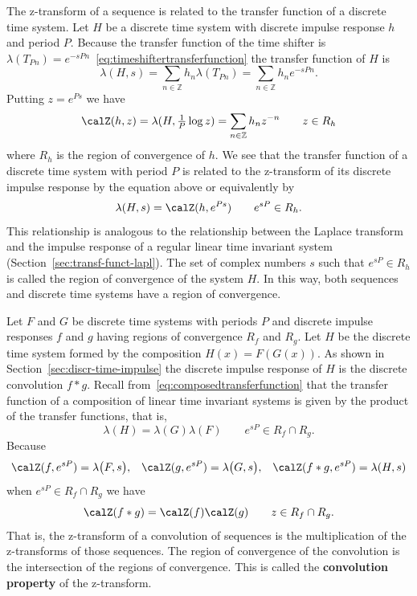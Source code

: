 \documentclass[11pt,a4paper]{book}
\theoremstyle{plain}
\numberwithin{equation}{section}
\newcommand{\ints}{{\mathbb Z}}
\newcommand{\term}{\textbf}
\begin{document}
The z-transform of a sequence is related to the transfer function of a discrete time system.  Let $H$ be a discrete time system with discrete impulse response $h$ and period $P$.  Because the transfer function of the time shifter is $\lambda(T_{Pn}) = e^{-sPn}$~\eqref{eq:timeshiftertransferfunction} the transfer function of $H$ is
\[
\lambda(H,s) = \sum_{n \in \ints} h_n \lambda( T_{Pn} ) = \sum_{n \in \ints} h_n e^{-sP n}.
\]
Putting $z = e^{Ps}$ we have
\[
\calZ(h,z) = \lambda(H, \tfrac{1}{P} \log z) = \sum_{n \in \ints} h_n z^{-n} \qquad z \in R_h
\]
where $R_h$ is the region of convergence of $h$.  We see that the transfer function of a discrete time system with period $P$ is related to the z-transform of its discrete impulse response by the equation above or equivalently by
\begin{equation}\label{eq:reltransferfunztrans}
\lambda(H,s) = \calZ(h,e^{Ps}) \qquad e^{sP} \in R_h.
\end{equation}
This relationship is analogous to the relationship between the Laplace transform and the impulse response of a regular linear time invariant system (Section~\ref{sec:transf-funct-lapl}).  The set of complex numbers $s$ such that $e^{sP} \in R_h$ is called the region of convergence of the system $H$.  In this way, both sequences and discrete time systems have a region of convergence. 

Let $F$ and $G$ be discrete time systems with periods $P$ and discrete impulse responses $f$ and $g$ having regions of convergence $R_f$ and $R_g$.  Let $H$ be the discrete time system formed by the composition $H(x)=F(G(x))$.  As shown in Section~\ref{sec:discr-time-impulse} the discrete impulse response of $H$ is the discrete convolution $f * g$.  Recall from~\eqref{eq:composedtransferfunction} that the transfer function of a composition of linear time invariant systems is given by the product of the transfer functions, that is,
\[
\lambda( H ) = \lambda(G)\lambda(F) \qquad e^{sP} \in R_f \cap R_g.
\]
Because
\[
\calZ(f, e^{sP}) = \lambda\big( F ,s \big) , \;\;\; \calZ(g, e^{sP}) = \lambda\big( G ,s \big), \;\;\; \calZ(f * g, e^{sP}) = \lambda( H ,s )
\]
when $e^{sP} \in R_f \cap R_g$ we have
\[
\calZ( f * g) = \calZ(f) \calZ(g) \qquad z \in R_f \cap R_g.
\]
That is, the z-transform of a convolution of sequences is the multiplication of the z-transforms of those sequences.  The region of convergence of the convolution is the intersection of the regions of convergence.  This is called the \term{convolution property} of the z-transform.
\end{document}

